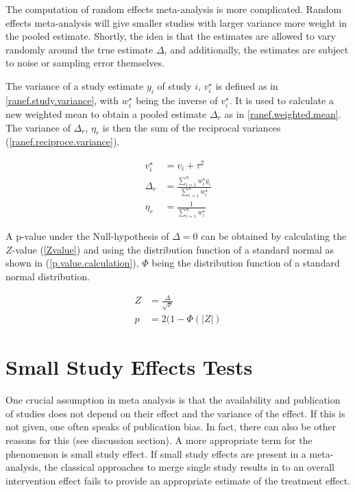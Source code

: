 \documentclass[11pt,a4paper,twoside]{book}\usepackage[]{graphicx}\usepackage[]{color}
\begin{document}
The computation of random effects meta-analysis is more complicated. Random effects meta-analysis will give smaller studies with larger variance more weight in the pooled estimate. Shortly, the idea is that the estimates are allowed to vary randomly around the true estimate $\Delta$, and additionally, the estimates are subject to noise or sampling error themselves. 

\vspace{0mm}
The variance of a study estimate $y_{i}$ of study $i$, $v_{i}^\star$ is defined as in \ref{ranef.study.variance}, with $w_{i}^\star$ being the inverse of $v_{i}^\star$. It is used to calculate a new weighted mean to obtain a pooled estimate $\Delta_{r}$ as in \ref{ranef.weighted.mean}. The variance of $\Delta_{r}$, $\eta_{r}$ is then the sum of the reciprocal variances (\ref{ranef.reciproce.variance}).

\begin{align}
v_{i}^\star &= v_{i} + \tau^2 \label{ranef.study.variance} \\
\Delta_{r} &= \frac{\sum_{i = 1}^n w_{i}^\star y_{i}}{\sum_{i = 1}^n w_{i}^\star} \label{ranef.weighted.mean} \\
\eta_{r} &= \frac{1}{\sum_{i = 1}^n w_{i}^\star} \label{ranef.reciproce.variance}
\end{align}

A p-value under the Null-hypothesis of $\Delta = 0$ can be obtained by calculating the $Z$-value (\ref{Zvalue}) and using the distribution function of a standard normal as shown in (\ref{p.value.calculation}), $\Phi$ being the distribution function of a standard normal distribution. 

\begin{align}
Z &= \frac{\Delta}{\sqrt{\nu}} \label{Zvalue} \\
p &= 2(1 - \Phi(|{Z}|) \label{p.value.calculation}
\end{align}

\section{Small Study Effects Tests}
One crucial assumption in meta analysis is that the availability and publication of studies does not depend on their effect and the variance of the effect. If this is not given, one often speaks of publication bias. In fact, there can also be other reasons for this (see discussion section). A more appropriate term for the phenomenon is small study effect. If small study effects are present in a meta-analysis, the classical approaches to merge single study results in to an overall intervention effect fails to provide an appropriate estimate of the treatment effect. 
\end{document}
